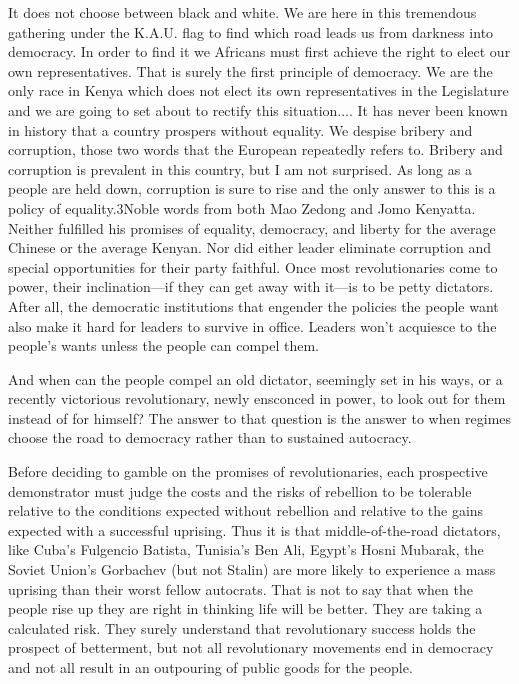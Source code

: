 \documentclass[10pt]{article}
\begin{document}
{\large It does not choose between black and white. We are here in this
tremendous gathering under the K.A.U. flag to find which road leads us from
darkness into democracy. In order to find it we Africans must first achieve the
right to elect our own representatives. That is surely the first principle of
democracy. We are the only race in Kenya which does not elect its own
representatives in the Legislature and we are going to set about to rectify this
situation.... It has never been known in history that a country prospers without
equality. We despise bribery and corruption, those two words that the European
repeatedly refers to. Bribery and corruption is prevalent in this country, but I
am not surprised. As long as a people are held down, corruption is sure to rise
and the only answer to this is a policy of equality.3Noble words from both Mao
Zedong and Jomo Kenyatta. Neither fulfilled his promises of equality, democracy,
and liberty for the average Chinese or the average Kenyan. Nor did either leader
eliminate corruption and special opportunities for their party faithful. Once
most revolutionaries come to power, their inclination---if they can get away with
it---is to be petty dictators. After all, the democratic institutions that
engender the policies the people want also make it hard for leaders to survive in
office. Leaders won't acquiesce to the people's wants unless the people can
compel them.}

{\large And when can the people compel an old dictator, seemingly set in his
ways, or a recently victorious revolutionary, newly ensconced in power, to look
out for them instead of for himself? The answer to that question is the answer to
when regimes choose the road to democracy rather than to sustained autocracy.}

{\large Before deciding to gamble on the promises of revolutionaries, each
prospective demonstrator must judge the costs and the risks of rebellion to be
tolerable relative to the conditions expected without rebellion and relative to
the gains expected with a successful uprising. Thus it is that middle-of-the-road
dictators, like Cuba's Fulgencio Batista, Tunisia's Ben Ali, Egypt's Hosni
Mubarak, the Soviet Union's Gorbachev (but not Stalin) are more likely to
experience a mass uprising than their worst fellow autocrats. That is not to say
that when the people rise up they are right in thinking life will be better. They
are taking a calculated risk. They surely understand that revolutionary success
holds the prospect of betterment, but not all revolutionary movements end in
democracy and not all result in an outpouring of public goods for the people.}
\end{document}
